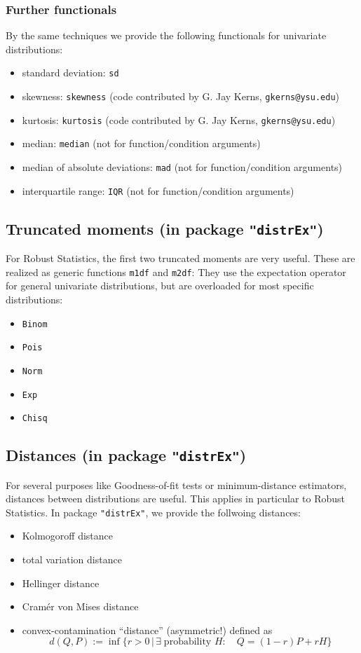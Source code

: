 \documentclass[11pt]{article}
\newcommand{\code}[1]{{\tt #1}}
\newcommand{\pkg}[1]{{\tt "#1"}}
\begin{document}
\subsubsection{Further functionals}
By the same techniques we provide the following functionals for univariate
distributions:
\begin{itemize}
  \item standard deviation: \code{sd}
  \item skewness: \code{skewness}
  (code contributed by G. Jay Kerns, {\small \tt gkerns@ysu.edu})
  \item kurtosis: \code{kurtosis}
   (code contributed by G. Jay Kerns, {\small \tt gkerns@ysu.edu})
  \item median: \code{median} (not for function/condition arguments)
  \item median of absolute deviations: \code{mad} (not for function/condition
  arguments)
  \item interquartile range: \code{IQR} (not for function/condition arguments)
\end{itemize}
%
\subsection[Truncated moments (in package distrEx)]{Truncated moments
(in package \pkg{distrEx})}\label{m1df}
%
For Robust Statistics, the first two truncated moments are very useful. These
are realized as generic functions \code{m1df} and \code{m2df}: They use the
expectation operator for general univariate distributions, but are overloaded
for most specific distributions:
\begin{itemize}
  \item \code{Binom}
  \item \code{Pois}
  \item \code{Norm}
  \item \code{Exp}
  \item \code{Chisq}
\end{itemize}
%
\subsection[Distances (in package distrEx)]{Distances (in package %
 \pkg{distrEx})}\label{Distances}
%
For several purposes like Goodness-of-fit tests or minimum-distance estimators,
distances between distributions are useful. This applies in particular to Robust
Statistics. In package \pkg{distrEx}, we provide the follwoing distances:
\begin{itemize}
  \item Kolmogoroff distance
  \item total variation distance
  \item Hellinger distance
  \item Cram\'er von Mises distance
  \item convex-contamination ``distance'' (asymmetric!) defined as
  $$
d(Q,P):=\inf\{r>0\,|\, \exists \;\mbox{probability } H:\quad Q=(1-r)P+rH \}
  $$
\end{itemize}
\end{document}
